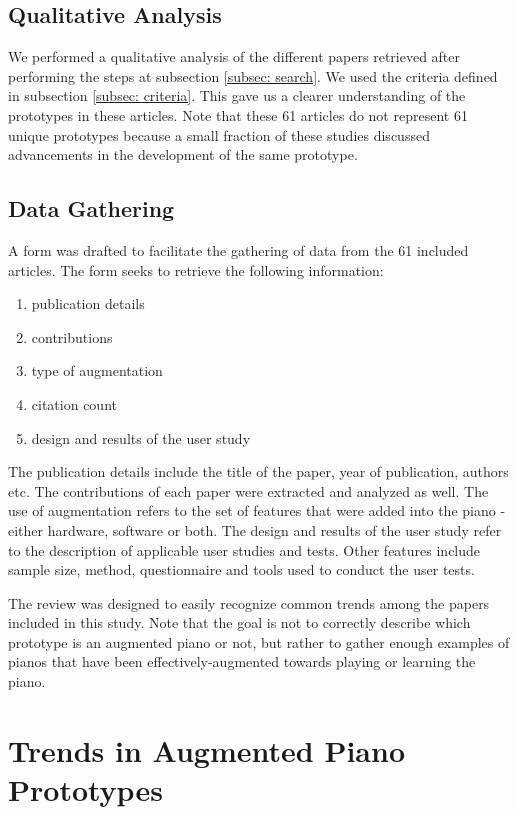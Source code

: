 \documentclass[sigchi, review]{acmart}
\begin{document}
\subsection{Qualitative Analysis}
We performed a qualitative analysis of the different papers retrieved after performing the steps at subsection \ref{subsec: search}. We used the criteria defined in subsection \ref{subsec: criteria}. This gave us a clearer understanding of the prototypes in these articles. Note that these 61 articles do not represent 61 unique prototypes because a small fraction of these studies discussed advancements in the development of the same prototype.

\subsection{Data Gathering}
\label{subsec: gathering}
A form was drafted to facilitate the gathering of data from the 61 included articles. The form seeks to retrieve the following information: 
\begin{enumerate}
    \item publication details
    \item contributions
    \item type of augmentation
    \item citation count
    \item design and results of the user study
\end{enumerate}
The publication details include the title of the paper, year of publication, authors etc. The contributions of each paper were extracted and analyzed as well. The use of augmentation refers to the set of features that were added into the piano - either hardware, software or both. The design and results of the user study refer to the description of applicable user studies and tests. Other features include sample size, method, questionnaire and tools used to conduct the user tests.

The review was designed to easily recognize common trends among the papers included in this study. Note that the goal is not to correctly describe which prototype is an augmented piano or not, but rather to gather enough examples of pianos that have been effectively-augmented towards playing or learning the piano.  

\section{Trends in Augmented Piano Prototypes}
\label{sec: trends}
\end{document}
